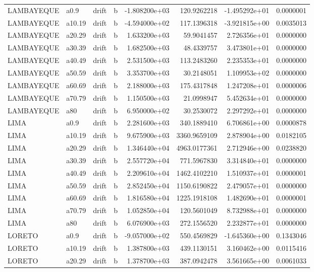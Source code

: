 \documentclass[
]{article}
\begin{document}
\begin{table}[!h]
\begin{tabular}[t]{llllrrrr}
LAMBAYEQUE & a0.9 & drift & b & -1.808200e+03 & 120.9262218 & -1.495292e+01 & 0.0000001\\
LAMBAYEQUE & a10.19 & drift & b & -4.594000e+02 & 117.1396318 & -3.921815e+00 & 0.0035013\\
LAMBAYEQUE & a20.29 & drift & b & 1.633200e+03 & 59.9041457 & 2.726356e+01 & 0.0000000\\
LAMBAYEQUE & a30.39 & drift & b & 1.682500e+03 & 48.4339757 & 3.473801e+01 & 0.0000000\\
\addlinespace
LAMBAYEQUE & a40.49 & drift & b & 2.531500e+03 & 113.2483260 & 2.235353e+01 & 0.0000000\\
LAMBAYEQUE & a50.59 & drift & b & 3.353700e+03 & 30.2148051 & 1.109953e+02 & 0.0000000\\
LAMBAYEQUE & a60.69 & drift & b & 2.188000e+03 & 175.4317848 & 1.247208e+01 & 0.0000006\\
LAMBAYEQUE & a70.79 & drift & b & 1.150500e+03 & 21.0998947 & 5.452634e+01 & 0.0000000\\
LAMBAYEQUE & a80 & drift & b & 6.950000e+02 & 30.2530072 & 2.297292e+01 & 0.0000000\\
\addlinespace
LIMA & a0.9 & drift & b & 2.281600e+03 & 340.1889410 & 6.706861e+00 & 0.0000878\\
LIMA & a10.19 & drift & b & 9.675900e+03 & 3360.9659109 & 2.878904e+00 & 0.0182105\\
LIMA & a20.29 & drift & b & 1.346440e+04 & 4963.0177361 & 2.712946e+00 & 0.0238820\\
LIMA & a30.39 & drift & b & 2.557720e+04 & 771.5967830 & 3.314840e+01 & 0.0000000\\
LIMA & a40.49 & drift & b & 2.209610e+04 & 1462.4102210 & 1.510937e+01 & 0.0000001\\
\addlinespace
LIMA & a50.59 & drift & b & 2.852450e+04 & 1150.6190822 & 2.479057e+01 & 0.0000000\\
LIMA & a60.69 & drift & b & 1.816580e+04 & 1225.1918108 & 1.482690e+01 & 0.0000001\\
LIMA & a70.79 & drift & b & 1.052850e+04 & 120.5601049 & 8.732988e+01 & 0.0000000\\
LIMA & a80 & drift & b & 6.076900e+03 & 272.1556520 & 2.232877e+01 & 0.0000000\\
LORETO & a0.9 & drift & b & -9.057000e+02 & 550.4569829 & -1.645360e+00 & 0.1343046\\
\addlinespace
LORETO & a10.19 & drift & b & 1.387800e+03 & 439.1130151 & 3.160462e+00 & 0.0115416\\
LORETO & a20.29 & drift & b & 1.378700e+03 & 387.0942478 & 3.561665e+00 & 0.0061033\\

\end{tabular}
\end{table}
\end{document}

